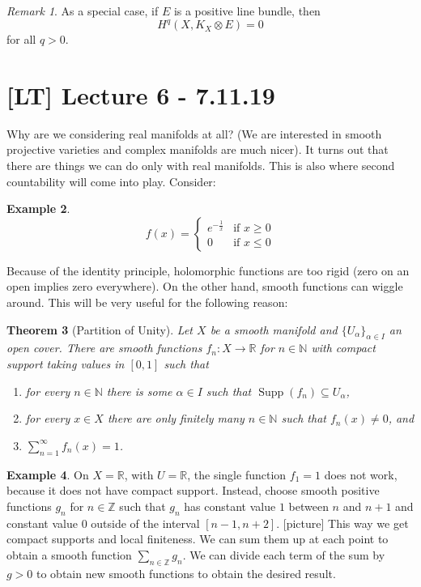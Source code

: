 \documentclass[11pt,A4]{article}
\theoremstyle{plain}
\newtheorem{thm}{Theorem}[section]
\theoremstyle{definition}
\newtheorem{exa}[thm]{Example}
\theoremstyle{remark}
\newtheorem{rem}[thm]{Remark}
\newcommand{\N}{\mathbb{N}}
\newcommand{\Z}{\mathbb{Z}}
\newcommand{\R}{\mathbb{R}}
\newcommand{\1}{\mathbbm{1}}
\DeclareMathOperator{\Supp}{Supp}
\newcommand{\ot}{\otimes}
\begin{document}
\begin{rem}
    As a special case, if $E$ is a positive line bundle, then
    \[H^{q}(X,K_{X}\ot E)=0\]
    for all $q>0$.
\end{rem}

\section{[LT] Lecture 6 - 7.11.19}

Why are we considering real manifolds at all?
(We are interested in smooth projective varieties and complex manifolds are much nicer).
It turns out that there are things we can do only with real manifolds.
This is also where second countability will come into play.
Consider:

\begin{exa}
    \[ f(x)=\begin{cases} e^{-\frac{1}{x}} &\text{if } x\geqslant 0 \\ 0 &\text{if } x\leqslant 0
    \end{cases} \]
\end{exa}
Because of the identity principle, holomorphic functions are too rigid (zero on an open implies zero everywhere).
On the other hand, smooth functions can wiggle around.
This will be very useful for the following reason:

\begin{thm}[Partition of Unity]
    Let $X$ be a smooth manifold and $\{ U_{\alpha}\}_{\alpha\in I}$ an open cover.
    There are smooth functions $f_{n}\colon X\to \R$ for $n\in \N$ with compact support taking values in $[0,1]$ such that
    \begin{enumerate}[label=\roman*)]
	\item for every $n\in \N$ there is some $\alpha\in I$ such that $\Supp(f_{n})\subseteq U_{\alpha}$,
	\item for every $x\in X$ there are only finitely many $n\in \N$ such that $f_{n}(x)\neq 0$, and
	\item $\sum_{n=1}^{\infty} f_{n}(x)=1$.
    \end{enumerate}
\end{thm}

\begin{exa}
    On $X=\R$, with $U=\R$, the single function $f_{1}=1$ does not work, because it does not have compact support.
    Instead, choose smooth positive functions $g_{n}$ for $n\in \Z$ such that $g_{n}$ has constant value $1$ between $n$ and $n+1$ and constant value $0$ outside of the interval $[n-1,n+2]$.
    [picture]
    This way we get compact supports and local finiteness.
    We can sum them up at each point to obtain a smooth function $\sum_{n\in \Z}g_{n}$.
    We can divide each term of the sum by $g>0$ to obtain new smooth functions to obtain the desired result.
\end{exa}
\end{document}
